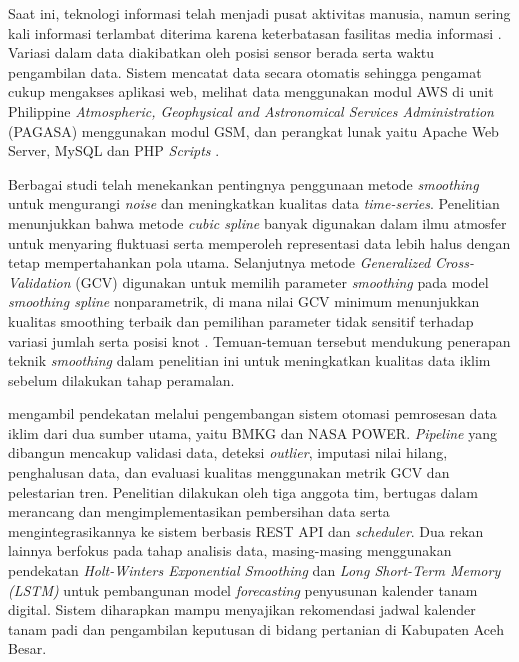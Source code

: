     Saat ini, teknologi informasi telah menjadi pusat aktivitas manusia, namun sering kali informasi terlambat diterima karena keterbatasan fasilitas media informasi \citep{Khoirunnisa2019}. Variasi dalam data diakibatkan oleh posisi sensor berada serta waktu pengambilan data. Sistem mencatat data secara otomatis sehingga pengamat cukup mengakses aplikasi web, melihat data menggunakan modul AWS di unit Philippine \textit{Atmospheric, Geophysical and Astronomical Services Administration} (PAGASA) menggunakan modul GSM, dan perangkat lunak yaitu Apache Web Server, MySQL dan PHP \textit{Scripts} \citep{cesar2019}.

    Berbagai studi telah menekankan pentingnya penggunaan metode \textit{smoothing} untuk mengurangi \textit{noise} dan meningkatkan kualitas data \textit{time-series}. Penelitian \cite{wust2017} menunjukkan bahwa metode \textit{cubic spline} banyak digunakan dalam ilmu atmosfer untuk menyaring fluktuasi serta memperoleh representasi data lebih halus dengan tetap mempertahankan pola utama. Selanjutnya metode \textit{Generalized Cross-Validation} (GCV) digunakan untuk memilih parameter \textit{smoothing} pada model \textit{smoothing spline} nonparametrik, di mana nilai GCV minimum menunjukkan kualitas smoothing terbaik dan pemilihan parameter tidak sensitif terhadap variasi jumlah serta posisi knot \citep{maharani2021}. Temuan-temuan tersebut mendukung penerapan teknik \textit{smoothing} dalam penelitian ini untuk meningkatkan kualitas data iklim sebelum dilakukan tahap peramalan.
    
    \Saya{} mengambil pendekatan melalui pengembangan sistem otomasi pemrosesan data iklim dari dua sumber utama, yaitu BMKG dan NASA POWER. \textit{Pipeline} yang dibangun mencakup validasi data, deteksi \textit{outlier}, imputasi nilai hilang, penghalusan data, dan evaluasi kualitas menggunakan metrik GCV dan pelestarian tren. Penelitian dilakukan oleh tiga anggota tim, \saya{} bertugas dalam merancang dan mengimplementasikan pembersihan data serta mengintegrasikannya ke sistem berbasis REST API dan \textit{scheduler}. Dua rekan lainnya berfokus pada tahap analisis data, masing-masing menggunakan pendekatan \textit{Holt-Winters Exponential Smoothing} dan \textit{Long Short-Term Memory (LSTM)} untuk pembangunan model \textit{forecasting} penyusunan kalender tanam digital. Sistem diharapkan mampu menyajikan rekomendasi jadwal kalender tanam padi dan pengambilan keputusan di bidang pertanian di Kabupaten Aceh Besar.

